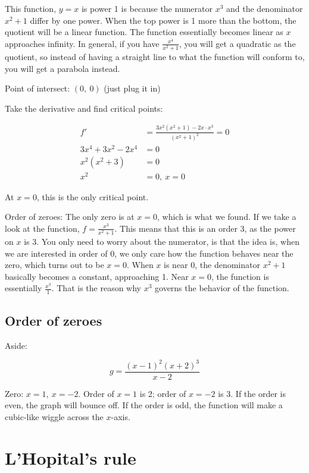 \documentclass[
]{article}
\begin{document}
This function, $y = x$ is power 1 is because the numerator $x^{3}$
and the denominator $x^{2} + 1$ differ by one power. When the top
power is 1 more than the bottom, the quotient will be a linear function.
The function essentially becomes linear as $x$ approaches infinity. In
general, if you have $\frac{x^{4}}{x^{2} + 1}$, you will get a
quadratic as the quotient, so instead of having a straight line to what
the function will conform to, you will get a parabola instead.

Point of intersect: $(0,\ 0)$ (just plug it in)

Take the derivative and find critical points:

\begin{align*}
f' &= \frac{3x^{2}\left( x^{2} + 1 \right) - 2x \cdot x^{3}}{\left( x^{2} + 1 \right)^{2}} = 0
 \\
3x^{4} + 3x^{2} - 2x^{4} &= 0
 \\
x^{2}\left( x^{2} + 3 \right) &= 0
 \\
x^{2} &= 0,\ x = 0
\end{align*}


At $x = 0$, this is the only critical point.

Order of zeroes: The only zero is at $x = 0$, which is what we found.
If we take a look at the function, $f = \frac{x^{3}}{x^{2} + 1}$. This
means that this is an order 3, as the power on $x$ is 3. You only need
to worry about the numerator, is that the idea is, when we are
interested in order of 0, we only care how the function behaves near the
zero, which turns out to be $x = 0$. When $x$ is near 0, the
denominator $x^{2} + 1$ basically becomes a constant, approaching 1.
Near $x = 0$, the function is essentially $\frac{x^{3}}{1}$. That is
the reason why $x^{3}$ governs the behavior of the function.


\subsection{Order of zeroes}

Aside:

$$g = \frac{(x - 1)^{2}(x + 2)^{3}}{x - 2}$$

Zero: $x = 1,\ x = - 2$. Order of $x = 1$ is 2; order of $x = - 2$
is 3. If the order is even, the graph will bounce off. If the order is
odd, the function will make a cubic-like wiggle across the $x$-axis.


\section{L'Hopital's rule}
\end{document}

